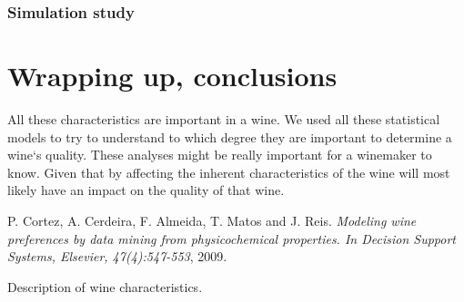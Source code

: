 \documentclass[11pt]{article}
\begin{document}
\section{Simulation study}\label{sec:simulation-study}




\part{Wrapping up, conclusions} \label{part:conclusions}


All these characteristics are important in a wine.
We used all these statistical models to try to understand to which degree they are important
to determine a wine`s quality.
These analyses might be really important for a winemaker to know.
Given that by affecting the inherent characteristics of the wine will most likely have an
impact on the quality of that wine.





\begin{thebibliography}{1}
 P. Cortez, A. Cerdeira, F. Almeida, T. Matos and J. Reis. {\em Modeling wine preferences by data mining from physicochemical properties.
In Decision Support Systems, Elsevier, 47(4):547-553},  2009.
\end{thebibliography}


\clearpage
\begin{table}
    \centering
    \caption{Description of wine characteristics.}
    \resizebox{\columnwidth}{!}{
    
    }
    \label{tab:description_wine}
\end{table}
\end{document}
